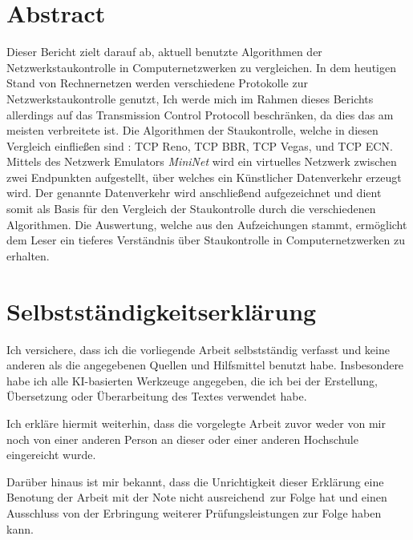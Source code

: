 \documentclass[paper=a4,fontsize=12pt,ngerman]{scrartcl}
\begin{document}
\pagestyle{plain}



\section*{Abstract}



Dieser Bericht zielt darauf ab, aktuell benutzte Algorithmen der Netzwerkstaukontrolle in Computernetzwerken zu vergleichen.
In dem heutigen Stand von Rechnernetzen werden verschiedene Protokolle zur Netzwerkstaukontrolle genutzt, 
Ich werde mich im Rahmen dieses Berichts allerdings auf das Transmission Control Protocoll beschränken, da dies das am meisten verbreitete ist.  \newline
Die Algorithmen der Staukontrolle, welche in diesen Vergleich einfließen sind : TCP Reno, TCP BBR, TCP Vegas, und TCP ECN.
\newline
Mittels des Netzwerk Emulators \textit{MiniNet} wird ein virtuelles Netzwerk zwischen zwei Endpunkten aufgestellt, über
welches ein Künstlicher Datenverkehr erzeugt wird.
Der genannte Datenverkehr wird anschließend aufgezeichnet und dient somit als Basis für den Vergleich der Staukontrolle durch 
die verschiedenen Algorithmen.
Die Auswertung, welche aus den Aufzeichungen stammt, ermöglicht dem Leser ein tieferes Verständnis über Staukontrolle in Computernetzwerken
zu erhalten. 




\newpage
\section*{Selbstständigkeitserklärung}
Ich versichere, dass ich die vorliegende Arbeit selbstständig verfasst und 
keine anderen als die angegebenen Quellen und Hilfsmittel benutzt habe.
Insbesondere habe ich alle KI-basierten Werkzeuge angegeben, die ich bei
der Erstellung, Übersetzung oder Überarbeitung des Textes verwendet habe.

Ich erkläre hiermit weiterhin, dass die vorgelegte Arbeit zuvor weder von mir 
noch von einer anderen Person an dieser oder einer anderen Hochschule 
eingereicht wurde.

Darüber hinaus ist mir bekannt, dass die Unrichtigkeit dieser Erklärung eine 
Benotung der Arbeit mit der Note \glqq nicht ausreichend\grqq \ zur Folge hat 
und einen Ausschluss von der Erbringung weiterer Prüfungsleistungen zur Folge 
haben kann.
\bigskip
 
\end{document}
